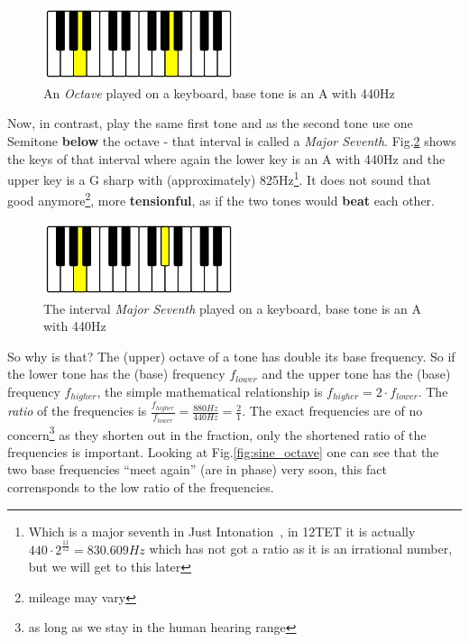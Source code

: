 \documentclass[12pt,a4paper,titlepage,oneside]{report}
\begin{document}
\begin{figure}[!ht]
\includegraphics[width=0.5\textwidth]{images/keyboard_octave.png}
\centering
\caption{An \emph{Octave} played on a keyboard, base tone is an A with 440Hz}
\label{fig:keyboard_octave}
\end{figure}

Now, in contrast, play the same first tone and as the second tone use one Semitone \textbf{below} the octave - that interval is called a \emph{Major Seventh}. Fig.\ref{fig:keyboard_major_seventh} shows the keys of that interval where again the lower key is an A with 440Hz and the upper key is a G sharp with (approximately) 825Hz\footnote{Which is a major seventh in Just Intonation~\cite{bib:just}, in 12TET it is actually $440 \cdot 2^{\frac{11}{12}} = 830.609Hz$ which has not got a ratio as it is an irrational number, but we will get to this later}. It does not sound that good anymore\footnote{mileage may vary}, more \textbf{tensionful}, as if the two tones would \textbf{beat} each other.

\begin{figure}[!ht]
\includegraphics[width=0.5\textwidth]{images/keyboard_major_seventh.png}
\centering
\caption{The interval \emph{Major Seventh} played on a keyboard, base tone is an A with 440Hz}
\label{fig:keyboard_major_seventh}
\end{figure}

So why is that? The (upper) octave of a tone has double its base frequency. So if the lower tone has the (base) frequency $f_{lower}$ and the upper tone has the (base) frequency $f_{higher}$, the simple mathematical relationship is $f_{higher} = 2 \cdot f_{lower}$. The \emph{ratio} of the frequencies is $\frac{f_{higher}}{f_{lower}} = \frac{880Hz}{440Hz} = \frac{2}{1}$. The exact frequencies are of no concern\footnote{as long as we stay in the human hearing range} as they shorten out in the fraction, only the shortened ratio of the frequencies is important. Looking at Fig.\ref{fig:sine_octave} one can see that the two base frequencies ``meet again'' (are in phase) very soon, this fact corrensponds to the low ratio of the frequencies.
\end{document}
